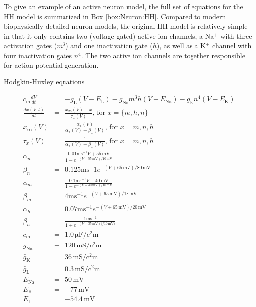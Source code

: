 To give an example of an active neuron model, the full set of equations for the HH model is summarized in Box \ref{box:Neuron:HH}. Compared to modern biophysically detailed neuron models, the original HH model is relatively simple in that it only contains two (voltage-gated) active ion channels, a Na$^+$ with three activation gates ($m^3$) and one inactivation gate ($h$), as well as a K$^+$ channel with four inactivation gates $n^4$. The two active ion channels are together responsible for action potential generation.  

\begin{floatingbox}[h]
\caption{Hodgkin-Huxley equations}

\begin{eqnarray*}
    c_{\mathrm{m}} \frac{dV}{dt} & =  & -\bar{g}_{\mathrm{L}}(V-E_{\mathrm{L}}) - \bar{g}_{\mathrm{Na}} m^3 h (V - E_{\mathrm{Na}}) - \bar{g}_{\mathrm{K}} n^4 (V - E_{\mathrm{K}}) \\
    \frac{dx(V,t)}{dt} & = & \frac{x_{\infty}(V) - x}{\tau_x(V)},  \, \text{for } x = \{m,h,n\} \\ 
    x_{\infty}(V) &= & \frac{\alpha_x(V)}{\alpha_x(V) + \beta_x(V)}, \, \text{for } x = m,n,h \\ %
    \tau_x(V) & = & \frac{1}{\alpha_x(V) + \beta_x(V)}, \, \text{for } x = m,n,h \\ %
    \alpha_n &=& \frac{0.01 \mathrm{ms}^{-1} V+55\,\si{\milli\volt}}{1-e^{-(V+55\,\si{\milli\volt})/10\,\si{\milli\volt}}}  \\ %
     \beta_n &=& 0.125 \mathrm{ms}^-1 e^{-(V+65\,\si{\milli\volt})/80\,\si{\milli\volt}}   \\ %
     \alpha_m &=& \frac{0.1 \mathrm{ms}^{-1} V+ 40\,\si{\milli\volt}} {1-e^{-(V+40\,\si{\milli\volt})/10\,\si{\milli\volt}}}  \\   
     \beta_m &=& 4 \mathrm{ms}^{-1} e^{-(V+65\,\si{\milli\volt})/18\,\si{\milli\volt}}  \\ %
    \alpha_h &=& 0.07 \mathrm{ms}^{-1} e^{-(V+65\,\si{\milli\volt})/20\,\si{\milli\volt}}  \\ %
    \beta_h &=& \frac{1 \mathrm{ms}^{-1}}{1+e^{-(V+35\,\si{\milli\volt}))/10\,\si{\milli\volt})}}   \\ %
    c_\mathrm{m} &=& 1.0 \,\si{\micro\farad\per\square\centi\metre} \\ %
    \bar{g}_{\mathrm{Na}} &=& 120 \,\si{\milli\siemens\per\square\centi\metre}\\ %
    \bar{g}_{\mathrm{K}} &=& 36 \,\si{\milli\siemens\per\square\centi\metre} \\ %
    \bar{g}_{\mathrm{L}} &=& 0.3 \,\si{\milli\siemens\per\square\centi\metre} \\ %
    E_{\mathrm{Na}} &=& 50 \,\si{\milli\volt} \\ %
    E_{\mathrm{K}} &=& -77  \,\si{\milli\volt} \\ %
    E_{\mathrm{L}} &=& -54.4 \,\si{\milli\volt} \\ %
\end{eqnarray*}
\label{box:Neuron:HH}
\end{floatingbox}
